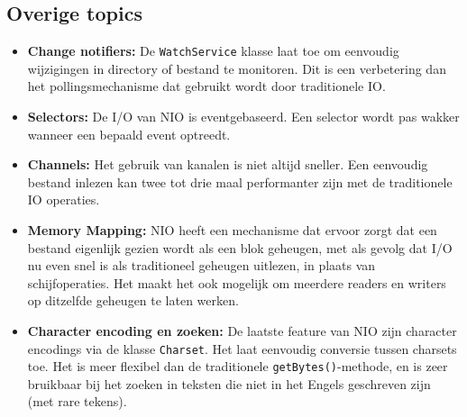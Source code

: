 \documentclass{report}
\begin{document}
\subsection{Overige topics}
\begin{itemize}
	\item[\info] \textbf{Change notifiers:} De \texttt{WatchService} klasse laat toe om eenvoudig wijzigingen in directory of bestand te monitoren. Dit is een verbetering dan het pollingsmechanisme dat gebruikt wordt door traditionele IO.
	\item[\info] \textbf{Selectors:} De I/O van NIO is eventgebaseerd. Een selector wordt pas wakker wanneer een bepaald event optreedt.
	\item[\info] \textbf{Channels:} Het gebruik van kanalen is niet altijd sneller. Een eenvoudig bestand inlezen kan twee tot drie maal performanter zijn met de traditionele IO operaties.
	\item[\info] \textbf{Memory Mapping:} NIO heeft een mechanisme dat ervoor zorgt dat een bestand eigenlijk gezien wordt als een blok geheugen, met als gevolg dat I/O nu even snel is als traditioneel geheugen uitlezen, in plaats van schijfoperaties. Het maakt het ook mogelijk om meerdere readers en writers op ditzelfde geheugen te laten werken. 
	\item[\info] \textbf{Character encoding en zoeken:} De laatste feature van NIO zijn character encodings via de klasse \texttt{Charset}. Het laat eenvoudig conversie tussen charsets toe. Het is meer flexibel dan de traditionele \texttt{getBytes()}-methode, en is zeer bruikbaar bij het zoeken in teksten die niet in het Engels geschreven zijn (met rare tekens). 
\end{itemize}
\end{document}
